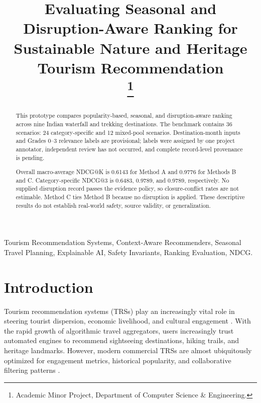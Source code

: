\documentclass[conference]{IEEEtran}
\begin{document}
\title{Evaluating Seasonal and Disruption-Aware Ranking for Sustainable Nature and Heritage Tourism Recommendation\\
\thanks{Academic Minor Project, Department of Computer Science \& Engineering.}
}

\author{
}

\maketitle

\begin{abstract}
This prototype compares popularity-based, seasonal, and disruption-aware ranking across nine Indian waterfall and trekking destinations. The benchmark contains 36 scenarios: 24 category-specific and 12 mixed-pool scenarios. Destination-month inputs and Grades 0--3 relevance labels are provisional; labels were assigned by one project annotator, independent review has not occurred, and complete record-level provenance is pending.

Overall macro-average NDCG@K is 0.6143 for Method A and 0.9776 for Methods B and C. Category-specific NDCG@3 is 0.6483, 0.9789, and 0.9789, respectively. No supplied disruption record passes the evidence policy, so closure-conflict rates are not estimable. Method C ties Method B because no disruption is applied. These descriptive results do not establish real-world safety, source validity, or generalization.
\end{abstract}

\begin{IEEEkeywords}
Tourism Recommendation Systems, Context-Aware Recommenders, Seasonal Travel Planning, Explainable AI, Safety Invariants, Ranking Evaluation, NDCG.
\end{IEEEkeywords}

\section{Introduction}
Tourism recommendation systems (TRSs) play an increasingly vital role in steering tourist dispersion, economic livelihood, and cultural engagement \cite{gavalas2014}. With the rapid growth of algorithmic travel aggregators, users increasingly trust automated engines to recommend sightseeing destinations, hiking trails, and heritage landmarks. However, modern commercial TRSs are almost ubiquitously optimized for engagement metrics, historical popularity, and collaborative filtering patterns \cite{werthner2004}.
\end{document}
